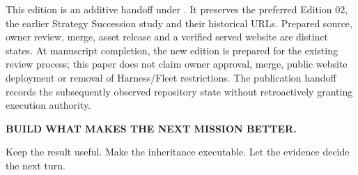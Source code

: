 This edition is an additive handoff under . It preserves
the preferred Edition 02\citep{preferredEditionTwo}, the earlier Strategy Succession study and their historical URLs. Prepared source,
owner review, merge, asset release and a verified served website are distinct states. At manuscript completion,
the new edition is prepared for the existing review process; this paper does not claim owner approval,
merge, public website deployment or removal of Harness/Fleet restrictions. The publication handoff records
the subsequently observed repository state without retroactively granting execution authority.

\medskip
{\sffamily\large\bfseries\color{purple}BUILD WHAT MAKES THE NEXT MISSION BETTER.}\par
{\sffamily\color{muted}Keep the result useful. Make the inheritance executable. Let the evidence decide the next turn.}
